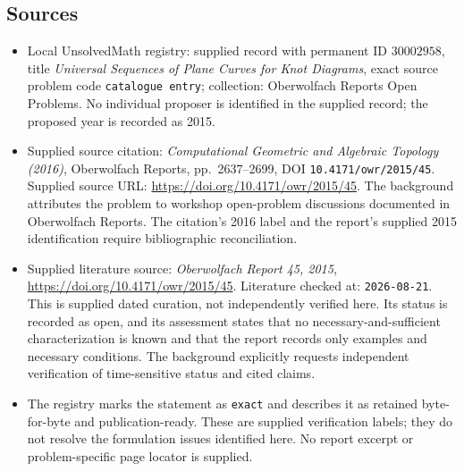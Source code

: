 \documentclass[11pt]{article}
\begin{document}
\subsection{Sources}
\begin{itemize}
\item Local UnsolvedMath registry: supplied record with permanent ID \(30002958\), title \emph{Universal Sequences of Plane Curves for Knot Diagrams}, exact source problem code \texttt{catalogue entry}; collection: Oberwolfach Reports Open Problems. No individual proposer is identified in the supplied record; the proposed year is recorded as 2015.
\item Supplied source citation: \emph{Computational Geometric and Algebraic Topology (2016)}, Oberwolfach Reports, pp.\ 2637--2699, DOI \texttt{10.4171/owr/2015/45}. Supplied source URL: \url{https://doi.org/10.4171/owr/2015/45}. The background attributes the problem to workshop open-problem discussions documented in Oberwolfach Reports. The citation's 2016 label and the report's supplied 2015 identification require bibliographic reconciliation.
\item Supplied literature source: \emph{Oberwolfach Report 45, 2015}, \url{https://doi.org/10.4171/owr/2015/45}. Literature checked at: \texttt{2026-08-21}. This is supplied dated curation, not independently verified here. Its status is recorded as open, and its assessment states that no necessary-and-sufficient characterization is known and that the report records only examples and necessary conditions. The background explicitly requests independent verification of time-sensitive status and cited claims.
\item The registry marks the statement as \texttt{exact} and describes it as retained byte-for-byte and publication-ready. These are supplied verification labels; they do not resolve the formulation issues identified here. No report excerpt or problem-specific page locator is supplied.
\end{itemize}
\end{document}

